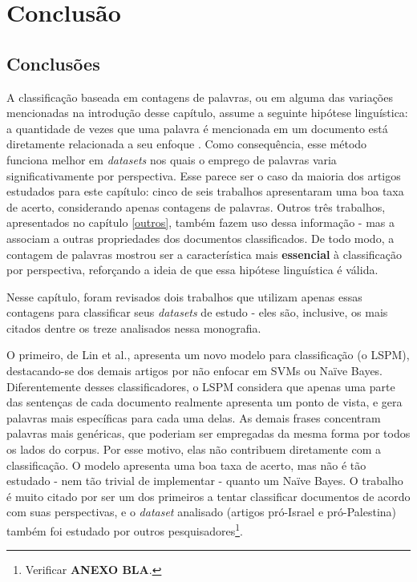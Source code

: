 \chapter{Conclusão}
\label{conclusoes}


\section{Conclusões}
\label{freqs:conc}


A classificação baseada em contagens de palavras, ou em alguma das variações mencionadas na introdução desse capítulo, assume a seguinte hipótese linguística: a quantidade de vezes que uma palavra é mencionada em um documento está diretamente relacionada a seu enfoque \cite{teubert}. Como consequência, esse método funciona melhor em \emph{datasets} nos quais o emprego de palavras varia significativamente por perspectiva. Esse parece ser o caso da maioria dos artigos estudados para este capítulo: cinco de seis trabalhos apresentaram uma boa taxa de acerto, considerando apenas contagens de palavras. Outros três trabalhos, apresentados no capítulo \ref{outros}, também fazem uso dessa informação - mas a associam a outras propriedades dos documentos classificados. De todo modo, a contagem de palavras mostrou ser a característica mais \textbf{essencial} à classificação por perspectiva, reforçando a ideia de que essa hipótese linguística é válida.


Nesse capítulo, foram revisados dois trabalhos que utilizam apenas essas contagens para classificar seus \emph{datasets} de estudo - eles são, inclusive, os mais citados dentre os treze analisados nessa monografia.

O primeiro, de Lin et al., apresenta um novo modelo para classificação (o LSPM), destacando-se dos demais artigos por não enfocar em SVMs ou Naïve Bayes. Diferentemente desses classificadores, o LSPM considera que apenas uma parte das sentenças de cada documento realmente apresenta um ponto de vista, e gera palavras mais específicas para cada uma delas. As demais frases concentram palavras mais genéricas, que poderiam ser empregadas da mesma forma por todos os lados do corpus. Por esse motivo, elas não contribuem diretamente com a classificação. O modelo apresenta uma boa taxa de acerto, mas não é tão estudado - nem tão trivial de implementar - quanto um Naïve Bayes. O trabalho é muito citado por ser um dos primeiros a tentar classificar documentos de acordo com suas perspectivas, e o \emph{dataset} analisado (artigos pró-Israel e pró-Palestina) também foi estudado por outros pesquisadores\footnote{Verificar \textbf{ANEXO BLA}.}.

